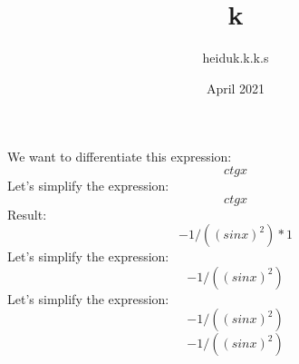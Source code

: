 \documentclass{article}
\title{k}
\author{heiduk.k.k.s }
\date{April 2021}
\begin{document}
\maketitle
\centering
We want to differentiate this expression:
$$ ctgx$$
\centering
Let's simplify the expression:
$$ ctgx$$
\centering
Result:
$$ -1/((sinx)^{2})*1$$
\centering
Let's simplify the expression:
$$ -1/((sinx)^{2})$$
\centering
Let's simplify the expression:
$$ -1/((sinx)^{2})$$
$$ -1/((sinx)^{2})$$
\end{document}
